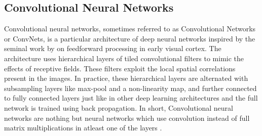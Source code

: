 \subsection{Convolutional Neural Networks}
\label{subsection:cnn-background}
Convolutional neural networks, sometimes referred to as Convolutional Networks 
or ConvNets, is a particular architecture of deep neural networks inspired 
by the seminal work by \citet{hubel1963shape} on feedforward processing in 
early visual cortex. The architecture uses hierarchical layers of tiled 
convolutional filters to mimic the effects of receptive fields. These filters 
exploit the local spatial correlations present in the images. In 
practice, these hierarchical layers are alternated with subsampling layers like 
max-pool and a non-linearity map, and further connected to fully connected 
layers just like in other deep learning architectures and the full 
network is trained using back propagation. In short, Convolutional neural 
networks are nothing but neural networks which use convolution instead of 
full matrix multiplications in atleast one of the layers \cite{bengio-dl-book}. 
\\
